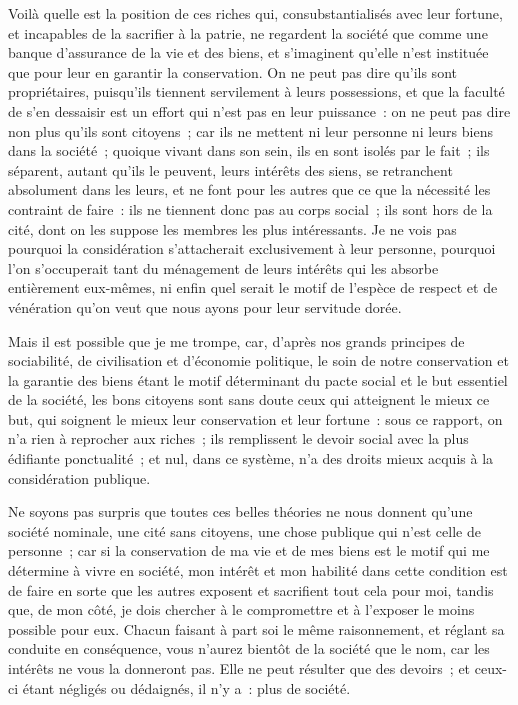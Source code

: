 \documentclass[french,twoside]{book} %
\begin{document}
Voilà quelle est la position de ces riches qui, consubstantialisés avec leur fortune, et incapables de la sacrifier à la patrie, ne regardent la société que comme une banque d’assurance de la vie et des biens, et s’imaginent qu’elle n’est instituée que pour leur en garantir la conservation. On ne peut pas dire qu’ils sont propriétaires, puisqu’ils tiennent servilement à leurs possessions, et que la faculté de s’en dessaisir est un effort qui n’est pas en leur puissance : on ne peut pas dire non plus qu’ils sont citoyens ; car ils ne mettent ni leur personne ni leurs biens dans la société ; quoique vivant dans son sein, ils en sont isolés par le fait ; ils séparent, autant qu’ils le peuvent, leurs intérêts des siens, se retranchent absolument dans les leurs, et ne font pour les autres que ce que la nécessité les contraint de faire : ils ne tiennent donc pas au corps social ; ils sont hors de la cité, dont on les suppose les membres les plus intéressants. Je ne vois pas pourquoi la considération s’attacherait exclusivement à leur personne, pourquoi l’on s’occuperait tant du ménagement de leurs intérêts qui les absorbe entièrement eux-mêmes, ni enfin quel serait le motif de l’espèce de respect et de vénération qu’on veut que nous ayons pour leur servitude dorée.\par
Mais il est possible que je me trompe, car, d’après nos grands principes de sociabilité, de civilisation et d’économie politique, le soin de notre conservation et la garantie des biens étant le motif déterminant du pacte social et le but essentiel de la société, les bons citoyens sont sans doute ceux qui atteignent le mieux ce but, qui soignent le mieux leur conservation et leur fortune : sous ce rapport, on n’a rien à reprocher aux riches ; ils remplissent le devoir social avec la plus édifiante ponctualité ; et nul, dans ce système, n’a des droits mieux acquis à la considération publique.\par
Ne soyons pas surpris que toutes ces belles théories ne nous donnent qu’une société nominale, une cité sans citoyens, une chose publique qui n’est celle de personne ; car si la conservation de ma vie et de mes biens est le motif qui me détermine à vivre en société, mon intérêt et mon habilité dans cette condition est de faire en sorte que les autres exposent et sacrifient tout cela pour moi, tandis que, de mon côté, je dois chercher à le compromettre et à l’exposer le moins possible pour eux. Chacun faisant à part soi le même raisonnement, et réglant sa conduite en conséquence, vous n’aurez bientôt de la société que le nom, car les intérêts ne vous la donneront pas. Elle ne peut résulter que des devoirs ; et ceux-ci étant négligés ou dédaignés, il n’y a : plus de société.\par
\end{document}
